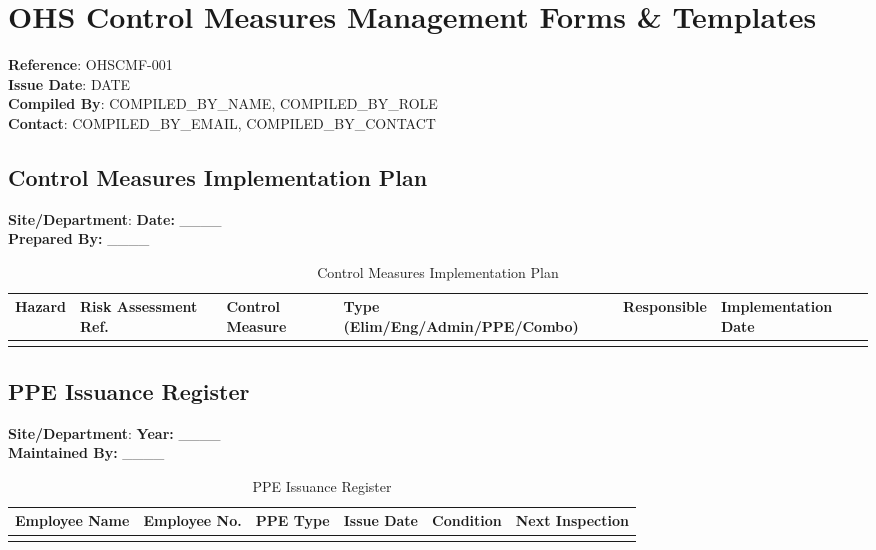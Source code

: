 \documentclass[11pt]{article}
\newcommand{\docTitle}{OHS Control Measures Management Forms \& Templates}
\newcommand{\refNumber}{OHSCMF-001}
\newcommand{\issueDate}{{{DATE}}}
\newcommand{\location}{}
\newcommand{\compilerName}{{{COMPILED_BY_NAME}}}
\newcommand{\compilerRole}{{{COMPILED_BY_ROLE}}}
\newcommand{\compilerEmail}{{{COMPILED_BY_EMAIL}}}
\newcommand{\compilerPhone}{{{COMPILED_BY_CONTACT}}}
\begin{document}
\section*{\docTitle}
\textbf{Reference}: \refNumber \\
\textbf{Issue Date}: \issueDate \\
\textbf{Compiled By}: \compilerName, \compilerRole \\
\textbf{Contact}: \compilerEmail, \compilerPhone

\subsection*{Control Measures Implementation Plan}

\textbf{Site/Department}: \location \textbf{Date:} \_\_\_\_ \\
\textbf{Prepared By:} \_\_\_\_

\begin{table}[h]
    \centering
    \begin{tabular}{p{2cm}p{3cm}p{3cm}p{2cm}p{2cm}p{2cm}}
        \toprule
        \textbf{Hazard} & \textbf{Risk Assessment Ref.} & \textbf{Control Measure} & \textbf{Type (Elim/Eng/Admin/PPE/Combo)} & \textbf{Responsible} & \textbf{Implementation Date} \\
        \midrule
        & & & & & \\
        \bottomrule
    \end{tabular}
    \caption{Control Measures Implementation Plan}
\end{table}

\subsection*{PPE Issuance Register}

\textbf{Site/Department}: \location \textbf{Year:} \_\_\_\_ \\
\textbf{Maintained By:} \_\_\_\_

\begin{table}[h]
    \centering
    \begin{tabular}{p{2cm}p{2cm}p{2cm}p{2cm}p{2cm}p{2cm}}
        \toprule
        \textbf{Employee Name} & \textbf{Employee No.} & \textbf{PPE Type} & \textbf{Issue Date} & \textbf{Condition} & \textbf{Next Inspection} \\
        \midrule
        & & & & & \\
        \bottomrule
    \end{tabular}
    \caption{PPE Issuance Register}
\end{table}
\end{document}
